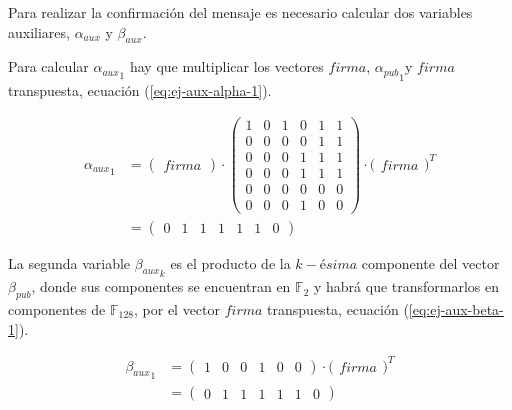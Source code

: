Para realizar la confirmación del mensaje es necesario calcular dos variables auxiliares, $\alpha_{aux}$ y $\beta_{aux}$.

Para calcular ${\alpha_{aux}}_1$ hay que multiplicar los vectores $firma$, ${\alpha_{pub}}_1$y $firma$ transpuesta, ecuación (\ref{eq:ej-aux-alpha-1}).

\begin{equation}\label{eq:ej-aux-alpha-1}
	\begin{aligned}
	{{\alpha_{aux}}_1} & = 
		\begin{pmatrix}firma\end{pmatrix}
		\cdot \left(\begin{smallmatrix}
			1 & 0 & 1 & 0 & 1 & 1\\
			0 & 0 & 0 & 0 & 1 & 1\\
			0 & 0 & 0 & 1 & 1 & 1\\
			0 & 0 & 0 & 1 & 1 & 1\\
			0 & 0 & 0 & 0 & 0 & 0\\
			0 & 0 & 0 & 1 & 0 & 0
		\end{smallmatrix}\right)
		\cdot \big(\begin{matrix}firma\end{matrix}\big)^{\scriptscriptstyle T}\\
		& = \left(\begin{smallmatrix}0 & 1 & 1 & 1 & 1 & 1 & 0\end{smallmatrix}\right)
	\end{aligned}
\end{equation}

La segunda variable ${\beta_{aux}}_k$ es el producto de la $k-ésima$ componente del vector $\beta_{pub}$, donde sus componentes se encuentran en $\mathds{F}_2$ y habrá que transformarlos en componentes de $\mathds{F}_{128}$, por el vector $firma$ transpuesta, ecuación (\ref{eq:ej-aux-beta-1}).

\begin{equation}\label{eq:ej-aux-beta-1}
	\begin{aligned}
	{{\beta_{aux}}_1} & = 
		\left(\begin{smallmatrix}1 & 0 & 0 & 1 & 0 & 0\end{smallmatrix}\right)
		\cdot \big(\begin{matrix}firma\end{matrix}\big)^{\scriptscriptstyle T}\\
		& = \left(\begin{smallmatrix}0 & 1 & 1 & 1 & 1 & 1 & 0\end{smallmatrix}\right)
	\end{aligned}
\end{equation}

